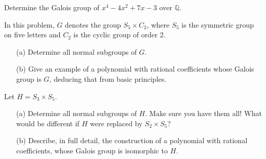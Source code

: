 \begin{prob}[F2009-Q3]
    Determine the Galois group of \(x^4 - 4x^2 + 7x - 3\) over \(\mathbb{Q}\).
\end{prob}

\begin{prob}[S2012-Q3]
    In this problem, \(G\) denotes the group \(S_5 \times C_2\), where \(S_5\) is the symmetric group on five letters and \(C_2\) is the cyclic group of order 2.
    \begin{itemize}
        \item[(a)] Determine all normal subgroups of \(G\).
        \item[(b)] Give an example of a polynomial with rational coefficients whose Galois group is \(G\), deducing that from basic principles.
    \end{itemize}
\end{prob}


\begin{prob}[F2015-Q4]
    Let \(H = S_3 \times S_5\).
    \begin{itemize}
        \item[(a)] Determine all normal subgroups of \(H\). Make sure you have them all! What would be different if \(H\) were replaced by \(S_2 \times S_5\)?
        \item[(b)] Describe, in full detail, the construction of a polynomial with rational coefficients, whose Galois group is isomorphic to \(H\).
    \end{itemize}
\end{prob}






